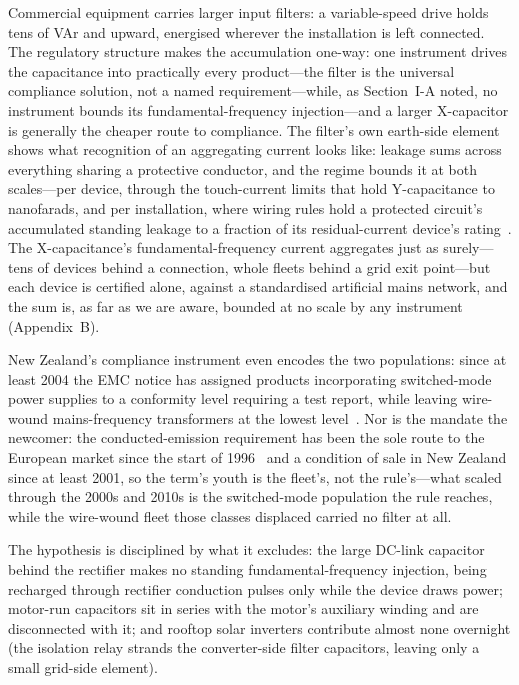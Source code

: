 \documentclass[journal]{IEEEtran}
\begin{document}
Commercial equipment carries larger input filters: a variable-speed
drive holds tens of VAr and upward, energised wherever the installation is
left connected. The regulatory structure makes the accumulation one-way: one
instrument drives the capacitance into practically every product---the filter is
the universal compliance solution, not a named requirement---while, as
Section~I-A
noted, no instrument bounds its fundamental-frequency injection---and a larger
X-capacitor is generally the cheaper route to compliance. The filter's own
earth-side element shows what recognition of an aggregating current looks
like: leakage sums across everything sharing a protective conductor, and the
regime bounds it at both scales---per device, through the touch-current
limits that hold Y-capacitance to nanofarads, and per installation, where
wiring rules hold a protected circuit's accumulated standing leakage to a
fraction of its residual-current device's rating~\cite{bs7671}. The
X-capacitance's fundamental-frequency current aggregates just as
surely---tens of devices behind a connection, whole fleets behind a grid exit
point---but each device is certified alone, against a standardised artificial
mains network, and the sum is, as far as we are aware, bounded at no scale by
any instrument (Appendix~B).

New Zealand's compliance instrument even encodes the two populations: since at least 2004 the
EMC notice has assigned products incorporating switched-mode power supplies to
a conformity level requiring a test report, while leaving wire-wound
mains-frequency transformers at the lowest level~\cite{rsm_emc2019}. Nor is
the mandate the newcomer: the conducted-emission requirement has been the
sole route to the European market since the start of 1996~\cite{eu_emc1989}
and a condition of sale in New Zealand since at least 2001, so the term's
youth is the fleet's, not the rule's---what scaled through the 2000s and
2010s is the switched-mode population the rule reaches, while the wire-wound
fleet those classes displaced carried no filter at all.

The hypothesis is disciplined by what it excludes: the large DC-link capacitor
behind the rectifier makes no standing fundamental-frequency injection, being
recharged through rectifier conduction pulses only while the device draws
power; motor-run
capacitors sit in series with the motor's auxiliary winding
and are disconnected with it; and rooftop solar inverters contribute almost
none overnight (the isolation relay strands the converter-side filter
capacitors, leaving only a small grid-side element).
\end{document}
